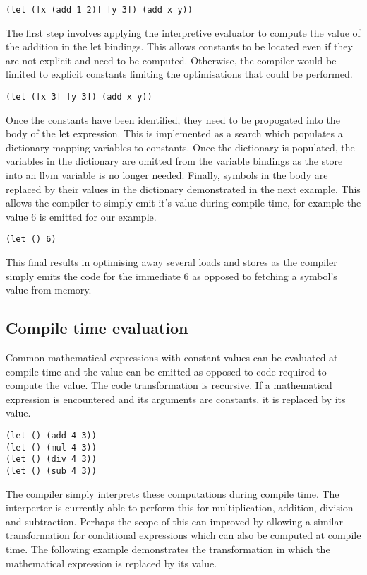 \documentclass{article}
\begin{document}
\begin{verbatim}
(let ([x (add 1 2)] [y 3]) (add x y))
\end{verbatim}

The first step involves applying the interpretive evaluator to compute the value of the addition in the let bindings. This allows constants to be located even if they are not explicit and need to be computed. Otherwise, the compiler would be limited to explicit constants limiting the optimisations that could be performed. 

\begin{verbatim}
(let ([x 3] [y 3]) (add x y))
\end{verbatim}

Once the constants have been identified, they need to be propogated into the body of the let expression. This is implemented as a search which populates a dictionary mapping variables to constants. Once the dictionary is populated, the variables in the dictionary are omitted from the variable bindings as the store into an llvm variable is no longer needed. Finally, symbols in the body are replaced by their values in the dictionary demonstrated in the next example. This allows the compiler to simply emit it's value during compile time, for example the value 6 is emitted for our example.

\begin{verbatim}
(let () 6)
\end{verbatim}

This final results in optimising away several loads and stores as the compiler simply emits the code for the immediate 6 as opposed to fetching a symbol's value from memory.

\subsection{Compile time evaluation}

Common mathematical expressions with constant values can be evaluated at compile time and the value can be emitted as opposed to code required to compute the value. The code transformation is recursive. If a mathematical expression is encountered and its arguments are constants, it is replaced by its value.

\begin{verbatim}
(let () (add 4 3))
(let () (mul 4 3))
(let () (div 4 3))
(let () (sub 4 3))
\end{verbatim}

The compiler simply interprets these computations during compile time. The  interperter is currently able to perform this for multiplication, addition, division and subtraction. Perhaps the scope of this can improved by allowing a similar transformation for conditional expressions which can also be computed at compile time. The following example demonstrates the transformation in which the mathematical expression is replaced by its value.
\end{document}
